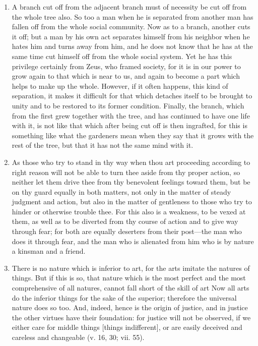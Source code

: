 \begin{enumerate}
\item A branch cut off from the adjacent branch must of necessity be cut off from the whole tree also. So too a man when he is separated from another man has fallen off from the whole social community. Now as to a branch, another cuts it off; but a man by his own act separates himself from his neighbor when he hates him and turns away from him, and he does not know that he has at the same time cut himself off from the whole social system. Yet he has this privilege certainly from Zeus, who framed society, for it is in our power to grow again to that which is near to us, and again to become a part which helps to make up the whole. However, if it often happens, this kind of separation, it makes it difficult for that which detaches itself to be brought to unity and to be restored to its former condition. Finally, the branch, which from the first grew together with the tree, and has continued to have one life with it, is not like that which after being cut off is then ingrafted, for this is something like what the gardeners mean when they say that it grows with the rest of the tree, but that it has not the same mind with it.

\item As those who try to stand in thy way when thou art proceeding according to right reason will not be able to turn thee aside from thy proper action, so neither let them drive thee from thy benevolent feelings toward them, but be on thy guard equally in both matters, not only in the matter of steady judgment and action, but also in the matter of gentleness to those who try to hinder or otherwise trouble thee. For this also is a weakness, to be vexed at them, as well as to be diverted from thy course of action and to give way through fear; for both are equally deserters from their post—the man who does it through fear, and the man who is alienated from him who is by nature a kinsman and a friend.

\item There is no nature which is inferior to art, for the arts imitate the natures of things. But if this is so, that nature which is the most perfect and the most comprehensive of all natures, cannot fall short of the skill of art Now all arts do the inferior things for the sake of the superior; therefore the universal nature does so too. And, indeed, hence is the origin of justice, and in justice the other virtues have their foundation: for justice will not be observed, if we either care for middle things [{\clarify things indifferent}], or are easily deceived and careless and changeable (v. 16, 30; vii. 55).


\end{enumerate}

